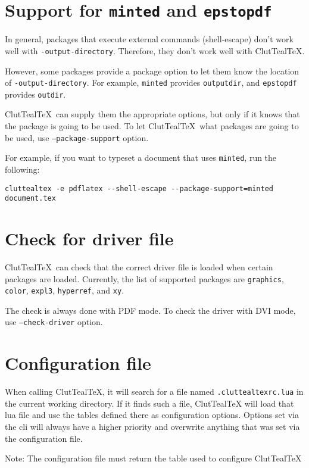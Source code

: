 \documentclass[a4paper]{report}
\newcommand\CluttealTeX{ClutTeal\TeX\xspace}
\newcommand\texpkg[1]{\texttt{#1}}
\begin{document}
\section{Support for \texpkg{minted} and \texpkg{epstopdf}}
In general, packages that execute external commands (shell-escape) don't work well with \texttt{-output-directory}.
Therefore, they don't work well with \CluttealTeX.

However, some packages provide a package option to let them know the location of \texttt{-output-directory}.
For example, \texpkg{minted} provides \texttt{outputdir}, and \texpkg{epstopdf} provides \texttt{outdir}.

\CluttealTeX\ can supply them the appropriate options, but only if it knows that the package is going to be used.
To let \CluttealTeX\ what packages are going to be used, use \texttt{--package-support} option.

For example, if you want to typeset a document that uses \texpkg{minted}, run the following:
\begin{verbatim}
cluttealtex -e pdflatex --shell-escape --package-support=minted document.tex
\end{verbatim}

\section{Check for driver file}

\CluttealTeX\ can check that the correct driver file is loaded when certain packages are loaded.
Currently, the list of supported packages are \texpkg{graphics}, \texpkg{color}, \texpkg{expl3}, \texpkg{hyperref}, and \texpkg{xy}.

The check is always done with PDF mode.
To check the driver with DVI mode, use \texttt{--check-driver} option.

\section{Configuration file}
When calling \CluttealTeX, it will search for a file named \verb|.cluttealtexrc.lua| in the current working directory. If it finds such a file, \CluttealTeX will load that lua file and use the tables defined there as configuration options. Options set via the cli will always have a higher priority and overwrite anything that was set via the configuration file.

Note: The configuration file must return the table used to configure \CluttealTeX
\end{document}
